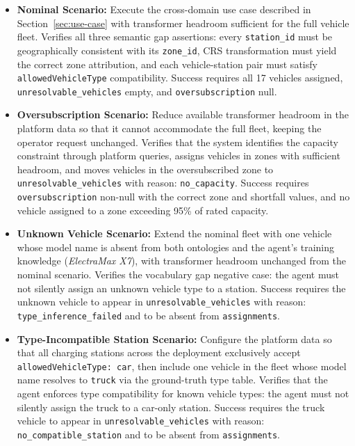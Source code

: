\begin{itemize}
    \item \textbf{Nominal Scenario:}
    Execute the cross-domain use case described in Section~\ref{sec:use-case}
        with transformer headroom sufficient for the full vehicle fleet.
    Verifies all three semantic gap assertions:
        every \texttt{station\_id} must be geographically consistent with its \texttt{zone\_id},
        CRS transformation must yield the correct zone attribution,
        and each vehicle-station pair must satisfy \texttt{allowedVehicleType} compatibility.
    Success requires all 17 vehicles assigned,
        \texttt{unresolvable\_vehicles} empty, and \texttt{oversubscription} null.

    \item \textbf{Oversubscription Scenario:}
    Reduce available transformer headroom in the platform data so that it
        cannot accommodate the full fleet,
        keeping the operator request unchanged.
    Verifies that the system identifies the capacity constraint through platform queries,
        assigns vehicles in zones with sufficient headroom,
        and moves vehicles in the oversubscribed zone to
        \texttt{unresolvable\_vehicles} with reason: \texttt{no\_capacity}.
    Success requires \texttt{oversubscription} non-null with the correct zone
        and shortfall values, and no vehicle assigned to a zone exceeding
        95\% of rated capacity.

    \item \textbf{Unknown Vehicle Scenario:}
    Extend the nominal fleet with one vehicle whose model name is absent
        from both ontologies and the agent's training knowledge
        (\textit{ElectraMax X7}),
        with transformer headroom unchanged from the nominal scenario.
    Verifies the vocabulary gap negative case:
        the agent must not silently assign an unknown vehicle type to a station.
    Success requires the unknown vehicle to appear in \texttt{unresolvable\_vehicles}
        with reason: \texttt{type\_inference\_failed}
        and to be absent from \texttt{assignments}.

    \item \textbf{Type-Incompatible Station Scenario:}
    Configure the platform data so that all charging stations across the deployment
        exclusively accept \texttt{allowedVehicleType: car},
        then include one vehicle in the fleet whose model name resolves to
        \texttt{truck} via the ground-truth type table.
    Verifies that the agent enforces type compatibility for known vehicle types:
        the agent must not silently assign the truck to a car-only station.
    Success requires the truck vehicle to appear in \texttt{unresolvable\_vehicles}
        with reason: \texttt{no\_compatible\_station}
        and to be absent from \texttt{assignments}.


\end{itemize}
